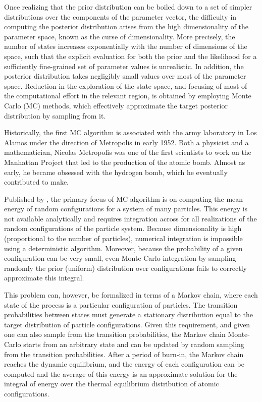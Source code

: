 Once realizing that the prior distribution can be boiled down to a set of simpler distributions over the components of the parameter vector, the difficulty in computing the posterior distribution arises from the high dimensionality of the parameter space, known as the curse of dimensionality.
More precisely, the number of states increases exponentially with the number of dimensions of the space, such that the explicit evaluation for both the prior and the likelihood for a sufficiently fine-grained set of parameter values is unrealistic.
In addition, the posterior distribution takes negligibly small values over most of the parameter space.
Reduction in the exploration of the state space, and focusing of most of the computational effort in the relevant region, is obtained by employing Monte Carlo (\acrshort{MC}) methods, which effectively approximate the target posterior distribution by sampling from it.

Historically, the first \acrshort{MC} algorithm is associated with the army laboratory in Los Alamos under the direction of Metropolis in early 1952.
Both a physicist and a mathematician, Nicolas Metropolis was one of the first scientists to work on the Manhattan Project that led to the production of the atomic bomb.
Almost as early, he became obsessed with the hydrogen bomb, which he eventually contributed to make.

Published by \citet{Metropolis1953}, the primary focus of \acrshort{MC} algorithm is on computing the mean energy of random configurations for a system of many particles.
This energy is not available analytically and requires integration across for all realizations of the random configurations of the particle system.
Because dimensionality is high (proportional to the number of particles), numerical integration is impossible using a deterministic algorithm.
Moreover, because the probability of a given configuration can be very small, even Monte Carlo integration by sampling randomly the prior (uniform) distribution over configurations fails to correctly approximate this integral.

This problem can, however, be formalized in terms of a Markov chain, where each state of the process is a particular configuration of particles.
The transition probabilities between states must generate a stationary distribution equal to the target distribution of particle configurations.
Given this requirement, and given one can also sample from the transition probabilities, the Markov chain Monte-Carlo starts from an arbitrary state and can be updated by random sampling from the transition probabilities.
After a period of burn-in, the Markov chain reaches the dynamic equilibrium, and the energy of each configuration can be computed and the average of this energy is an approximate solution for the integral of energy over the thermal equilibrium distribution of atomic configurations.

